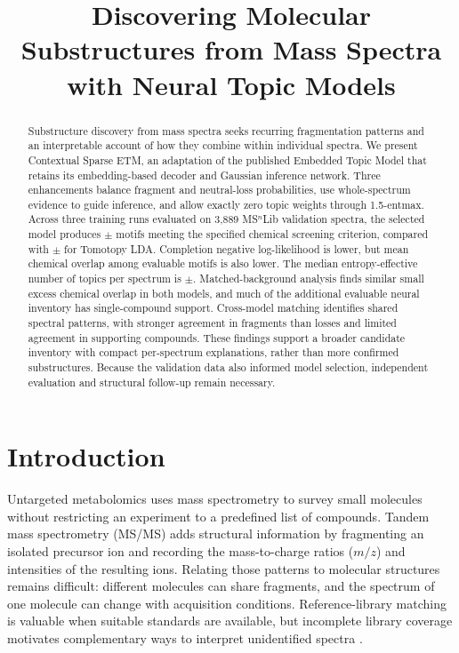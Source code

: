 \documentclass[10pt,a4paper]{article}
\title{Discovering Molecular Substructures from Mass Spectra\\with Neural Topic Models}
\author{}
\date{}
\begin{document}
\maketitle

\begin{abstract}
Substructure discovery from mass spectra seeks recurring fragmentation
patterns and an interpretable account of how they combine within individual
spectra. We present Contextual Sparse ETM, an adaptation of the published
Embedded Topic Model that retains its embedding-based decoder and Gaussian
inference network. Three enhancements balance fragment and neutral-loss
probabilities, use whole-spectrum evidence to guide inference, and allow
exactly zero topic weights through 1.5-entmax.
Across three training runs evaluated on 3,889 MS$^{n}$Lib validation spectra, the selected model
produces \CurrentUsefulMean{}$\pm$\CurrentUsefulSD{} motifs meeting the
specified chemical screening criterion, compared with
\ReferenceLDAUseful{}$\pm$\ReferenceLDAUsefulSD{} for Tomotopy LDA.
Completion negative log-likelihood is lower, but mean chemical overlap among
evaluable motifs is also lower. The median entropy-effective number of topics
per spectrum is \CurrentEffectiveMean{}$\pm$\CurrentEffectiveSD{}.
Matched-background analysis finds similar small excess chemical overlap in
both models, and much of the additional evaluable neural inventory has
single-compound support. Cross-model matching identifies shared spectral
patterns, with stronger agreement in fragments than losses and limited
agreement in supporting compounds. These findings support a broader candidate
inventory with compact per-spectrum explanations, rather than more confirmed
substructures. Because the validation data also informed model selection,
independent evaluation and structural follow-up remain necessary.
\end{abstract}

\section{Introduction}

Untargeted metabolomics uses mass spectrometry to survey small molecules
without restricting an experiment to a predefined list of compounds.
Tandem mass spectrometry (MS/MS) adds structural information by fragmenting
an isolated precursor ion and recording the mass-to-charge ratios ($m/z$)
and intensities of the resulting ions. Relating those patterns to molecular
structures remains difficult: different molecules can share fragments, and
the spectrum of one molecule can change with acquisition conditions.
Reference-library matching is valuable when suitable standards are available,
but incomplete library coverage motivates complementary ways to interpret
unidentified spectra \cite{huber2021,vanderhooft2016}.
\end{document}
